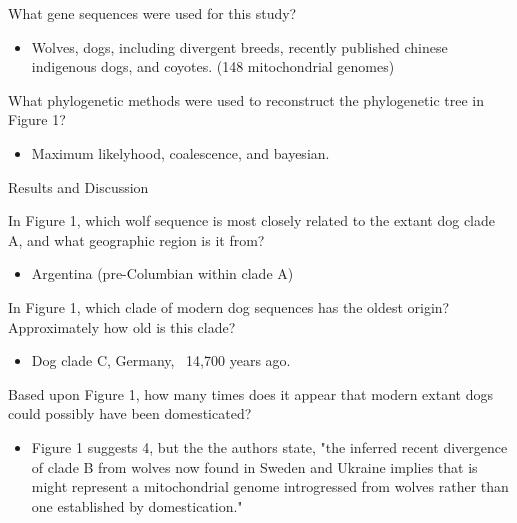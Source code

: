 \documentclass[12pt,a4paper]{article}
\begin{document}
\begin{itemize}
\begin{itemize}
\begin{itemize}
                \end{itemize}
            {\color{darklc} \item  What gene sequences were used for this study?}
                \begin{itemize}
                    \item Wolves, dogs, including divergent breeds, recently published chinese indigenous dogs, and coyotes. (148 mitochondrial genomes)
                \end{itemize}
            {\color{darklc} \item  What phylogenetic methods were used to reconstruct the phylogenetic tree in Figure 1?}
                \begin{itemize}
                    \item Maximum likelyhood, coalescence, and bayesian.
                \end{itemize}
        \end{itemize}
    \item Results and Discussion
        \begin{itemize}
            {\color{darklc} \item In Figure 1, which wolf sequence is most closely related to the extant dog clade A, and what geographic region is it from?}
                \begin{itemize}
                    \item Argentina (pre-Columbian within clade A)
                \end{itemize}
            {\color{darklc} \item In Figure 1, which clade of modern dog sequences has the oldest origin? Approximately how old is this clade?}
                \begin{itemize}
                    \item Dog clade C, Germany, ~14,700 years ago.
                \end{itemize}
            {\color{darklc} \item Based upon Figure 1, how many times does it appear that modern extant dogs could possibly have been domesticated?}
                \begin{itemize}
                    \item Figure 1 suggests 4, but the the authors state, {\color{G-Moon}"the inferred recent divergence of clade B from wolves now found in Sweden and Ukraine implies that is might represent a mitochondrial genome introgressed from wolves rather than one established by domestication."}

\end{itemize}
\end{itemize}
\end{itemize}
\end{document}
